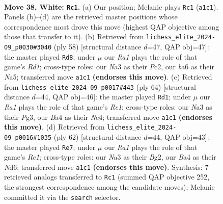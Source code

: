 \documentclass[11pt]{article}
\begin{document}
\clearpage

\begin{figure}[p]\centering
\begin{subfigure}{0.46\textwidth}\centering
\resizebox{\linewidth}{!}{%
\newchessgame
\chessboard[
  setfen={r7/p2p4/bppn2k1/5p1p/BPP2P2/N7/P2P3P/R3K3 w - - 0 38},
  showmover=false,
  pgfstyle=straightmove, color=movearrow, markmove={a1-c1}
]}
\caption{}
\end{subfigure}\hfill
\begin{subfigure}{0.46\textwidth}\centering
\resizebox{\linewidth}{!}{%
\newchessgame
\chessboard[
  setfen={5bk1/p1r2p1p/6p1/N3p3/P1p1n3/4B2P/1PP2PP1/3R2K1 w - - 0 30},
  showmover=false,
  pgfstyle=straightmove, color=movearrow, markmove={d1-d8}
]}
\caption{}
\end{subfigure}
\\[4pt]
\begin{subfigure}{0.46\textwidth}\centering
\resizebox{\linewidth}{!}{%
\newchessgame
\chessboard[
  setfen={5r2/p1b1k1p1/Ppp1p2p/2p5/2P1NP2/6PP/1P4K1/4R3 w - - 2 33},
  showmover=false,
  pgfstyle=straightmove, color=movearrow, markmove={e1-d1}
]}
\caption{}
\end{subfigure}\hfill
\begin{subfigure}{0.46\textwidth}\centering
\resizebox{\linewidth}{!}{%
\newchessgame
\chessboard[
  setfen={r7/3b1pk1/p2N1n1p/3P4/pP3PpP/P7/5PB1/4R1K1 w - - 1 32},
  showmover=false,
  pgfstyle=straightmove, color=movearrow, markmove={e1-e7}
]}
\caption{}
\end{subfigure}
\caption{\textbf{Move 38, White: \texttt{Rc1}.} (a) Our position; Melanie plays \texttt{Rc1} (\texttt{a1c1}). Panels (b)--(d) are the retrieved master positions whose correspondence most drove this move (highest QAP objective among those that transfer to it). (b) Retrieved from \texttt{lichess\_elite\_2024-09\_p0030\#3040} (ply 58) [structural distance $d$=47, QAP obj=47]: the master played \texttt{Rd8}; under $\mu$ our \emph{Ra1} plays the role of that game's \emph{Rd1}; cross-type roles: our \emph{N}a3 as their \emph{P}c2, our \emph{b}a6 as their \emph{N}a5; transferred move \texttt{a1c1} \textbf{(endorses this move)}. (c) Retrieved from \texttt{lichess\_elite\_2024-09\_p0017\#443} (ply 64) [structural distance $d$=44, QAP obj=46]: the master played \texttt{Rd1}; under $\mu$ our \emph{Ra1} plays the role of that game's \emph{Re1}; cross-type roles: our \emph{N}a3 as their \emph{P}g3, our \emph{B}a4 as their \emph{N}e4; transferred move \texttt{a1c1} \textbf{(endorses this move)}. (d) Retrieved from \texttt{lichess\_elite\_2024-09\_p0016\#1035} (ply 62) [structural distance $d$=44, QAP obj=43]: the master played \texttt{Re7}; under $\mu$ our \emph{Ra1} plays the role of that game's \emph{Re1}; cross-type roles: our \emph{N}a3 as their \emph{B}g2, our \emph{B}a4 as their \emph{N}d6; transferred move \texttt{a1c1} \textbf{(endorses this move)}. Synthesis: 7 retrieved analogs transferred to \texttt{Rc1} (summed QAP objective 252, the strongest correspondence among the candidate moves); Melanie committed it via the \texttt{search} selector.}
\label{fig:thought-m74}
\end{figure}
\end{document}
